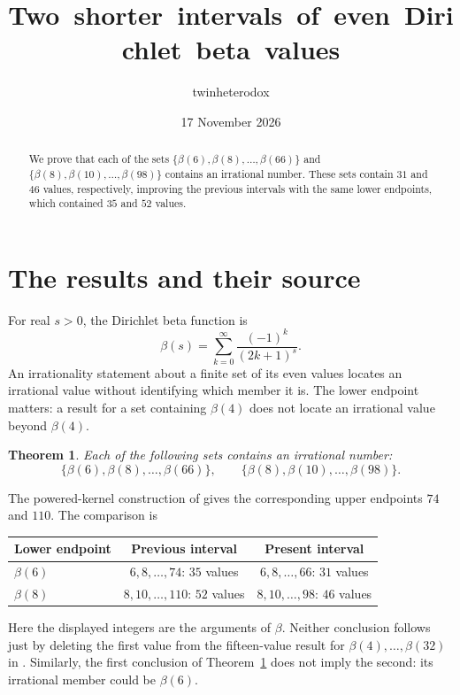 \documentclass[11pt]{article}
\title{\fontsize{16}{20}\selectfont
 \mbox{Two shorter intervals of even Dirichlet beta values}}
\author{twinheterodox}
\date{17 November 2026}
\newtheorem{theorem}{Theorem}
\theoremstyle{remark}
\numberwithin{equation}{section}
\begin{document}
\maketitle
\begin{abstract}
We prove that each of the sets
$\{\beta(6),\beta(8),\ldots,\beta(66)\}$ and
$\{\beta(8),\beta(10),\ldots,\beta(98)\}$ contains an irrational number.
These sets contain $31$ and $46$ values, respectively, improving the
previous intervals with the same lower endpoints, which contained
$35$ and $52$ values.
\end{abstract}

\section{The results and their source}

For real $s>0$, the Dirichlet beta function is
\[
 \beta(s)=\sum_{k=0}^{\infty}\frac{(-1)^k}{(2k+1)^s}.
\]
An irrationality statement about a finite set of its even values
locates an irrational value without identifying which member it is.
The lower endpoint matters: a result for a set containing $\beta(4)$
does not locate an irrational value beyond $\beta(4)$.

\begin{theorem}\label{thm:main}
Each of the following sets contains an irrational number:
\[
 \{\beta(6),\beta(8),\ldots,\beta(66)\},\qquad
 \{\beta(8),\beta(10),\ldots,\beta(98)\}.
\]
\end{theorem}

The powered-kernel construction of \cite[Theorem~1]{powered} gives
the corresponding upper endpoints $74$ and $110$. The comparison is
\begin{center}
\begin{tabular}{@{}lcc@{}}
\toprule
Lower endpoint & Previous interval & Present interval\\
\midrule
$\beta(6)$ & $6,8,\ldots,74$: $35$ values
           & $6,8,\ldots,66$: $31$ values\\
$\beta(8)$ & $8,10,\ldots,110$: $52$ values
           & $8,10,\ldots,98$: $46$ values\\
\bottomrule
\end{tabular}
\end{center}
Here the displayed integers are the arguments of $\beta$.
Neither conclusion follows just by deleting the first value from
the fifteen-value result for $\beta(4),\ldots,\beta(32)$ in
\cite{fifteen}. Similarly, the first conclusion of
Theorem~\ref{thm:main} does not imply the second: its irrational
member could be $\beta(6)$.
\end{document}
